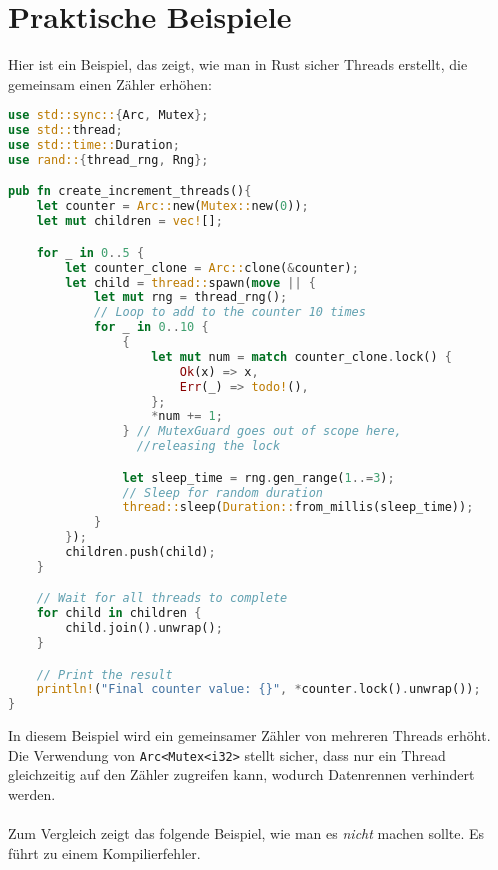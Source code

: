 \cleardoublepage
\section{Praktische Beispiele}

Hier ist ein Beispiel, das zeigt, wie man in Rust sicher Threads erstellt, die gemeinsam einen Zähler erhöhen:

\begin{lstlisting}[language=Rust, caption=Sicheres Erstellen von Threads mit Rust]
use std::sync::{Arc, Mutex};
use std::thread;
use std::time::Duration;
use rand::{thread_rng, Rng}; 

pub fn create_increment_threads(){
    let counter = Arc::new(Mutex::new(0));
    let mut children = vec![];

    for _ in 0..5 {
        let counter_clone = Arc::clone(&counter);
        let child = thread::spawn(move || {
            let mut rng = thread_rng(); 
            // Loop to add to the counter 10 times
            for _ in 0..10 { 
                {
                    let mut num = match counter_clone.lock() {
                        Ok(x) => x,
                        Err(_) => todo!(),
                    };
                    *num += 1;
                } // MutexGuard goes out of scope here, 
                  //releasing the lock

                let sleep_time = rng.gen_range(1..=3); 
                // Sleep for random duration
                thread::sleep(Duration::from_millis(sleep_time)); 
            }
        });
        children.push(child);
    }

    // Wait for all threads to complete
    for child in children {
        child.join().unwrap();
    }

    // Print the result
    println!("Final counter value: {}", *counter.lock().unwrap());
}
\end{lstlisting}
\noindent
In diesem Beispiel wird ein gemeinsamer Zähler von mehreren Threads erhöht. 
Die Verwendung von \texttt{Arc<Mutex<i32>} stellt sicher, dass nur ein Thread gleichzeitig auf den Zähler zugreifen kann, wodurch Datenrennen verhindert werden.\\
\\
Zum Vergleich zeigt das folgende Beispiel, wie man es \emph{nicht} machen sollte. Es führt zu einem Kompilierfehler. 

